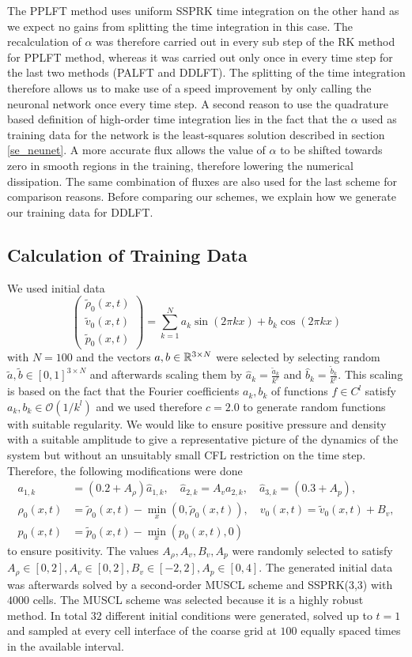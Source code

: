 The PPLFT method uses uniform SSPRK time integration on the other hand as we expect no gains from splitting the time integration in this case. The recalculation of $\alpha$ was therefore carried out in every sub step of the RK method for PPLFT method, whereas it was carried out only once in every time step for the last two methods (PALFT and DDLFT). The splitting of the time integration therefore allows us to make use of a speed improvement by only calling the neuronal network once every time step. A second reason to use the quadrature based definition of high-order time integration lies in the fact that the $\alpha$ used as training data for the network is the least-squares solution described in section \ref{se_neunet}. A more accurate flux allows the value of $\alpha$ to be shifted towards zero in smooth regions in the training, therefore lowering the numerical dissipation. The same combination of fluxes are also used for the last scheme for comparison reasons. Before comparing our schemes, we explain how we generate our training data for DDLFT.
	\subsection{Calculation of Training Data}
		We used initial data
	\[
		\begin{pmatrix}\tilde \rho_0(x, t)\\ \tilde v_0(x, t) \\ \tilde p_0(x, t) \end{pmatrix} = \sum_{k=1}^{N} a_k \sin(2\pi k x) + b_k\cos(2 \pi k x)
	\]
	with $N = 100$ and the vectors $a, b \in \mathbb{R}^{3 \times N}$ were selected by selecting random $\tilde a, \tilde b \in [0, 1]^{3 \times N}$ and afterwards scaling them by $
		\hat a_k = \frac {\tilde a_k}{k^{c}}$ and $ \hat b_k = \frac{\tilde b_k}{k^c}.$
	This scaling is based on the fact that the Fourier coefficients $a_k, b_k$ of functions $f \in C^l$ satisfy $a_k, b_k \in \mathcal O(1/k^l)$ and we used therefore $c =2.0$ to generate random functions with suitable regularity. We would like to ensure positive pressure and density with a suitable amplitude to give a representative picture of the dynamics of the system but without an unsuitably small CFL restriction on the time step. Therefore, the following modifications were done 
	\[
		\begin{aligned}
			 a_{1, k} &= (0.2 + A_\rho)\hat a_{1, k}, \quad  \hat  a_{2, k} = A_v a_{2, k},\quad  \hat a_{3, k} = (0.3 + A_p), \\
			\rho_0(x, t) & = \tilde \rho_0(x, t) - \min_x(0, \tilde \rho_0(x, t)), \quad  v_0(x, t) = \tilde v_0(x, t) + B_v, \\  p_0(x, t)  &= \tilde p_0(x, t) - \min_x(p_0(x, t), 0)
		\end{aligned}
	\]
	to ensure positivity. The values $A_\rho, A_v, B_v, A_p$ were randomly selected to satisfy $A_\rho \in [0, 2], A_v \in [0, 2], B_v \in [-2, 2], A_p \in [0, 4]$.  
	The generated initial data was afterwards solved  by a second-order MUSCL scheme and SSPRK(3,3)  with $4000$ cells. The MUSCL scheme was selected because it is a highly robust method. In total $32$ different initial conditions were generated, solved up to $t = 1$ and sampled at every cell interface of the coarse grid at $100$ equally spaced times in the available interval.
